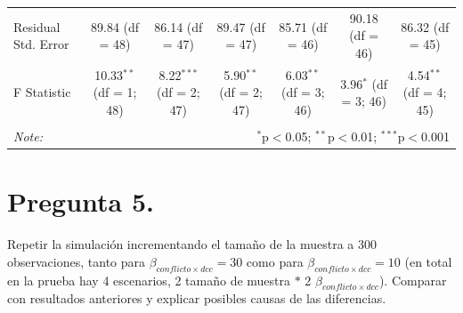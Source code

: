 \documentclass[
  spanish,
  10pt,
]{article}
\begin{document}
\begin{table}[H]
\begin{tabular}{@{\extracolsep{5pt}}lcccccc}
Residual Std. Error & 89.84 (df = 48) & 86.14 (df = 47) & 89.47 (df = 47) & 85.71 (df = 46) & 90.18 (df = 46) & 86.32 (df = 45) \\ 
F Statistic & 10.33$^{**}$ (df = 1; 48) & 8.22$^{***}$ (df = 2; 47) & 5.90$^{**}$ (df = 2; 47) & 6.03$^{**}$ (df = 3; 46) & 3.96$^{*}$ (df = 3; 46) & 4.54$^{**}$ (df = 4; 45) \\ 
\hline 
\hline \\[-1.8ex] 
\textit{Note:}  & \multicolumn{6}{r}{$^{*}$p$<$0.05; $^{**}$p$<$0.01; $^{***}$p$<$0.001} \\ 
\end{tabular} 
\end{table}

\section{Pregunta 5.}\label{pregunta-5.}

Repetir la simulación incrementando el tamaño de la muestra a 300
observaciones, tanto para \(\beta_{conflicto \times dcc} = 30\) como
para \(\beta_{conflicto \times dcc} = 10\) (en total en la prueba hay 4
escenarios, 2 tamaño de muestra \(\ast\) 2
\(\beta_{conflicto \times dcc}\)). Comparar con resultados anteriores y
explicar posibles causas de las diferencias.
\end{document}
